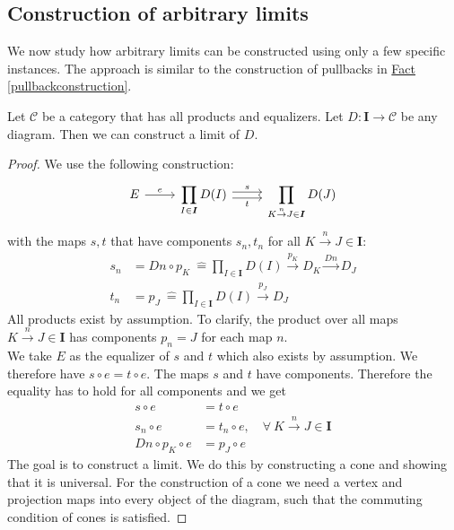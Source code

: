 \subsection{Construction of arbitrary limits}
\label{arbitrarylimits}
We now study how arbitrary limits can be constructed using only a
few specific instances.
The approach is similar to the construction of pullbacks in
\hyperref[pullbackconstruction]{Fact \ref*{pullbackconstruction}}.

\begin{fact}
  Let $\mathscr C$ be a category that has all products and equalizers.
  Let $D : \bm I \to \mathscr C$ be any diagram.
  Then we can construct a limit of $D$.
\end{fact}
\begin{proof}
We use the following construction:
\[
  \begin{tikzcd}
    E \arrow{r}{e} &
    \displaystyle \prod_{I \in \bm{I}} D(I)
    \arrow[r,shift left, "s"] \arrow[r,shift right,swap,"t"] &
    \displaystyle \prod_{K \overset{n}{\to} J \in \bm{I}} D(J)
  \end{tikzcd}
\]
with the maps $s, t$ that have components $s_n, t_n$ for all $K \overset{n}{\to} J \in \bm{I}$:
\begin{align*}
  s_n &= Dn \circ p_K\ \hat{=} \prod_{I \in \bm{I}} D(I)
        \overset{p_K}{\rightarrow} D_K \overset{Dn}{\rightarrow} D_J \\
  t_n &= p_J\ \hat{=} \prod_{I \in \bm{I}} D(I)
        \overset{p_J}{\rightarrow} D_J
\end{align*}
All products exist by assumption.
To clarify, the product over all maps $K \overset{n}{\to} J \in \bm{I}$
has components $p_n = J$ for each map $n$.\\
We take $E$ as the equalizer of $s$ and $t$ which also exists by assumption.
We therefore have $s \circ e = t \circ e$.
The maps $s$ and $t$ have components. Therefore the equality has to hold for all
components and we get
\begin{align*}
  s \circ e &= t \circ e\\
  s_n \circ e &= t_n \circ e, \quad \forall\ K \overset{n}{\rightarrow} J \in \bm I \\
  Dn \circ p_K \circ e &= p_J \circ e
\end{align*}
The goal is to construct a limit.
We do this by constructing a cone and showing that it is universal.
For the construction of a cone
we need a vertex and projection maps into every object of the diagram,
such that the commuting condition of cones is satisfied.

\end{proof}
